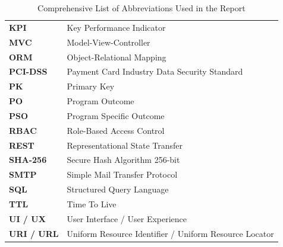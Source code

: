 \begin{table}[H]
\begin{tabularx}{\textwidth}{p{3.2cm}X}
\textbf{KPI} & Key Performance Indicator \\
\textbf{MVC} & Model-View-Controller \\
\textbf{ORM} & Object-Relational Mapping \\
\textbf{PCI-DSS} & Payment Card Industry Data Security Standard \\
\textbf{PK} & Primary Key \\
\textbf{PO} & Program Outcome \\
\textbf{PSO} & Program Specific Outcome \\
\textbf{RBAC} & Role-Based Access Control \\
\textbf{REST} & Representational State Transfer \\
\textbf{SHA-256} & Secure Hash Algorithm 256-bit \\
\textbf{SMTP} & Simple Mail Transfer Protocol \\
\textbf{SQL} & Structured Query Language \\
\textbf{TTL} & Time To Live \\
\textbf{UI / UX} & User Interface / User Experience \\
\textbf{URI / URL} & Uniform Resource Identifier / Uniform Resource Locator \\
\bottomrule
\end{tabularx}
\caption{Comprehensive List of Abbreviations Used in the Report}
\label{tab:abbreviations}
\end{table}
